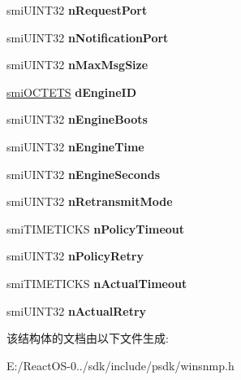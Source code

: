 \begin{DoxyCompactItemize}
smi\+U\+I\+N\+T32 {\bfseries n\+Request\+Port}
\item 
\mbox{\label{structsmi_e_n_t_i_t_y_i_n_f_o_a1e5b1fae6ee87ba052f52b7cbc8459a8}} 
smi\+U\+I\+N\+T32 {\bfseries n\+Notification\+Port}
\item 
\mbox{\label{structsmi_e_n_t_i_t_y_i_n_f_o_a11d57620530ea246b404db1c2409841a}} 
smi\+U\+I\+N\+T32 {\bfseries n\+Max\+Msg\+Size}
\item 
\mbox{\label{structsmi_e_n_t_i_t_y_i_n_f_o_a739057d5e620f74aad52f6a9f63f0eea}} 
\hyperlink{structsmi_o_c_t_e_t_s}{smi\+O\+C\+T\+E\+TS} {\bfseries d\+Engine\+ID}
\item 
\mbox{\label{structsmi_e_n_t_i_t_y_i_n_f_o_a3624ce869bceda720d82583618e2b9a7}} 
smi\+U\+I\+N\+T32 {\bfseries n\+Engine\+Boots}
\item 
\mbox{\label{structsmi_e_n_t_i_t_y_i_n_f_o_a3395bab4f962becc34945d6c180bb10f}} 
smi\+U\+I\+N\+T32 {\bfseries n\+Engine\+Time}
\item 
\mbox{\label{structsmi_e_n_t_i_t_y_i_n_f_o_ae5975a17026eadb7844e1d59eb50bff5}} 
smi\+U\+I\+N\+T32 {\bfseries n\+Engine\+Seconds}
\item 
\mbox{\label{structsmi_e_n_t_i_t_y_i_n_f_o_a3ad0228f31f0110763fe6145392729cd}} 
smi\+U\+I\+N\+T32 {\bfseries n\+Retransmit\+Mode}
\item 
\mbox{\label{structsmi_e_n_t_i_t_y_i_n_f_o_a7ea8b917c6791f7e6bf1357e39d8318f}} 
smi\+T\+I\+M\+E\+T\+I\+C\+KS {\bfseries n\+Policy\+Timeout}
\item 
\mbox{\label{structsmi_e_n_t_i_t_y_i_n_f_o_a0d964b3d1567f562f38bf882abd64b58}} 
smi\+U\+I\+N\+T32 {\bfseries n\+Policy\+Retry}
\item 
\mbox{\label{structsmi_e_n_t_i_t_y_i_n_f_o_a7688dc8742e4e3abcf454c7a2a94bfa5}} 
smi\+T\+I\+M\+E\+T\+I\+C\+KS {\bfseries n\+Actual\+Timeout}
\item 
\mbox{\label{structsmi_e_n_t_i_t_y_i_n_f_o_ae8a1e2ba72219441e4c3b46f036b46f1}} 
smi\+U\+I\+N\+T32 {\bfseries n\+Actual\+Retry}
\end{DoxyCompactItemize}


该结构体的文档由以下文件生成\+:\begin{DoxyCompactItemize}
\item 
E\+:/\+React\+O\+S-\/0../sdk/include/psdk/winsnmp.\+h\end{DoxyCompactItemize}
